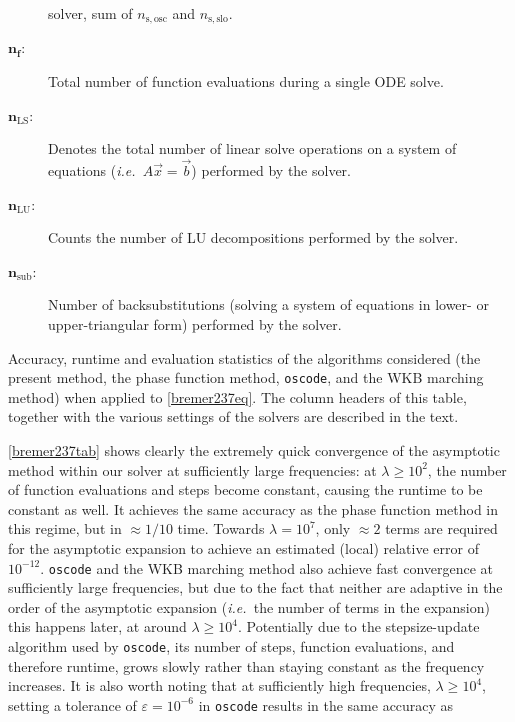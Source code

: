 \documentclass[10pt]{article}
\newcommand{\ie}{{\it i.e.\ }}
\begin{document}
\begin{description}
{        solver, sum of $n_{\mathrm{s,osc}}$ and $n_{\mathrm{s,slo}}$.}
    \item[$\bm{n_f}$:]{Total number of function evaluations during a single ODE solve.}
    \item[$\bm{n_{\mathrm{LS}}}$:]{Denotes the total number of linear solve
        operations on a system of equations (\ie $A\vec{x} = \vec{b}$)
        performed by the solver.}
    \item[$\bm{n_{\mathrm{LU}}}$:]{Counts the number of LU decompositions
        performed by the solver. }
    \item[$\bm{n_{\mathrm{sub}}}$:]{Number of backsubstitutions (solving a
        system of equations in lower- or upper-triangular form) performed by
        the solver.}
\end{description}
%
\begin{table}[tb]
    \renewcommand{\arraystretch}{1.2}
    \resizebox{\textwidth}{!}{}
    \caption{\label{bremer237tab} Accuracy, runtime and evaluation statistics of the algorithms
    considered (the present method, the phase function method, \texttt{oscode},
    and the WKB marching method) when applied to \cref{bremer237eq}. The column
    headers of this table, together with the various settings of the solvers
    are described in the text.}
\end{table}
%
\cref{bremer237tab} shows clearly the extremely quick convergence of the asymptotic method within our solver
at sufficiently large frequencies: at $\lambda \geq 10^2$, the number of
function evaluations and steps become constant, causing the runtime to be
constant as well. It achieves the same accuracy as the phase function method in
this regime, but in $\approx 1/10$ time. Towards $\lambda = 10^7$, only
$\approx 2$ terms are required for the asymptotic expansion to achieve an
estimated (local) relative error of $10^{-12}$. 
\texttt{oscode} and the WKB
marching method also achieve fast convergence at sufficiently large
frequencies, but due to the fact that neither are adaptive in the order of the
asymptotic expansion (\ie the number of terms in the expansion) this
happens later, at around $\lambda \geq 10^4$. Potentially due to the
stepsize-update algorithm used by \texttt{oscode}, its number of steps,
function evaluations, and therefore runtime, grows slowly rather than staying
constant as the frequency increases. It is also worth noting that at
sufficiently high frequencies, $\lambda \geq 10^4$, setting a tolerance of
$\varepsilon = 10^{-6}$ in \texttt{oscode} results in the same accuracy as
\end{document}
